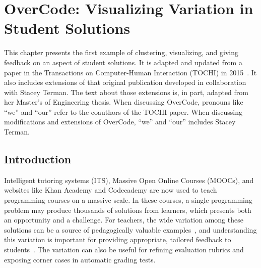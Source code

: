 \documentclass[12pt,twoside]{mitthesis}
\providecommand{\DIFaddtex}[1]{{\protect\color{blue}\uwave{#1}}} %
\providecommand{\DIFaddbegin}{} %
\providecommand{\DIFaddend}{} %
\providecommand{\DIFadd}[1]{\texorpdfstring{\DIFaddtex{#1}}{#1}} %
\begin{document}

%
\pagestyle{plain}
%

\pagestyle{fancyplain}
\addtolength{\headheight}{\baselineskip}

%
%
\chapter{OverCode: Visualizing Variation in Student Solutions}\label{chapter:overcode}


This chapter presents the first example of clustering, visualizing, and giving feedback on an aspect of student solutions. It is adapted and updated  from a paper in the Transactions on Computer-Human Interaction (TOCHI) in 2015~\cite{overcode}. It also includes extensions of that original publication developed in collaboration with Stacey Terman. The text about those extensions is, in part, adapted from her Master's of Engineering thesis\DIFaddbegin \DIFadd{~\mbox{%
\cite{staceythesis}}%
}\DIFaddend . When discussing OverCode, pronouns like ``we'' and ``our'' refer to the coauthors of the TOCHI paper. When discussing modifications and extensions of OverCode, ``we'' and ``our'' includes Stacey Terman.

\section{Introduction}

Intelligent tutoring systems (ITS), Massive Open Online Courses (MOOCs), and websites like Khan Academy and Codecademy are now used to teach programming courses on a massive scale. In these courses, a single programming problem may produce thousands of solutions from learners, which presents both an opportunity and a challenge. For teachers, the wide variation among these solutions can be a source of pedagogically valuable examples~\cite{marton13}, and understanding this variation is important for providing appropriate, tailored feedback to students~\cite{basupowergrading,MOOCshop}. The variation can also be useful for refining evaluation rubrics and exposing corner cases in automatic grading tests.
\end{document}
